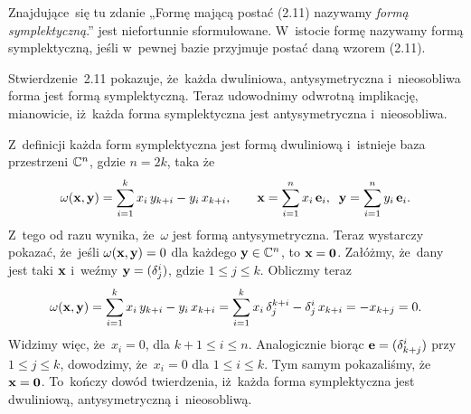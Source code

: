 \documentclass[a4paper,11pt]{article}
\begin{document}
\vspace{\spaceFour}





 Znajdujące~się tu zdanie „Formę mającą postać (2.11)
nazywamy \textit{formą symplektyczną}.” jest niefortunnie sformułowane.
W~istocie formę nazywamy formą symplektyczną, jeśli w~pewnej bazie
przyjmuje postać daną wzorem (2.11).

Stwierdzenie~2.11 pokazuje, że~każda dwuliniowa, antysymetryczna
i~nieosobliwa forma jest formą symplektyczną. Teraz udowodnimy odwrotną
implikację, mianowicie, iż~każda forma symplektyczna jest antysymetryczna
i~nieosobliwa.

Z~definicji każda form symplektyczna jest formą dwuliniową i~istnieje baza
przestrzeni $\mathbb{C}^{ n }$, gdzie $n = 2k$, taka że
\begin{equation}
  \label{eq:Wojtynski-26}
  \omega( \mathbf{x}, \mathbf{y} ) =
  \sum_{ i = 1 }^{ k } x_{ i } \, y_{ k + i } - y_{ i } \, x_{ k + i }, \qquad
  \mathbf{x} = \sum_{ i = 1 }^{ n } x_{ i } \, \mathbf{e}_{ i }, \;\;
  \mathbf{y} = \sum_{ i = 1 }^{ n } y_{ i } \, \mathbf{e}_{ i }.
\end{equation}
Z~tego od razu wynika, że~$\omega$ jest formą antysymetryczna. Teraz wystarczy
pokazać, że~jeśli $\omega( \mathbf{x}, \mathbf{y} ) = 0$ dla każdego
$\mathbf{y} \in \mathbb{C}^{ n }$, to $\mathbf{x} = \mathbf{0}$. Załóżmy, że~dany
jest taki $\mathbf{x}$ i~weźmy $\mathbf{y} = ( \delta^{ i }_{ j } )$, gdzie
$1 \leq j \leq k$. Obliczmy teraz
\begin{equation}
  \label{eq:Wojtynski-27}
  \omega( \mathbf{x}, \mathbf{y} ) =
  \sum_{ i = 1 }^{ k } x_{ i } \, y_{ k + i } - y_{ i } \, x_{ k + i } =
  \sum_{ i = 1 }^{ k } x_{ i } \, \delta^{ k + i }_{ j } - \delta^{ i }_{ j } \, x_{ k + i } =
  -x_{ k + j } = 0.
\end{equation}
Widzimy więc, że~$x_{ i } = 0$, dla $k + 1 \leq i \leq n$. Analogicznie biorąc
$\mathbf{e} = ( \delta^{ i }_{ k + j } )$ przy $1 \leq j \leq k$, dowodzimy,
że~$x_{ i } = 0$ dla $1 \leq i \leq k$. Tym samym pokazaliśmy,
że~$\mathbf{x} = \mathbf{0}$. To~kończy dowód twierdzenia, iż~każda forma
symplektyczna jest dwuliniową, antysymetryczną i~nieosobliwą.

\vspace{\spaceFour}
\end{document}
